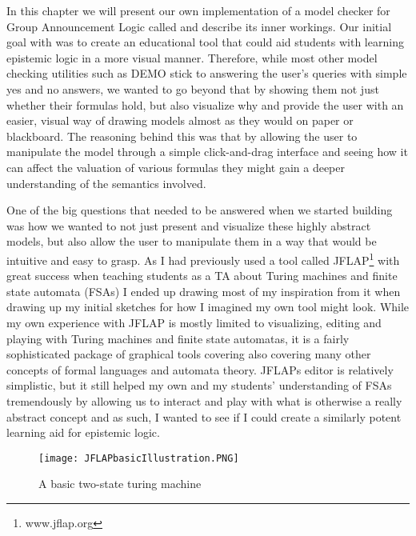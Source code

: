 In this chapter we will present our own implementation of a model checker for Group Announcement Logic called \cname{} and describe its inner workings. Our initial goal with \cname{} was to create an educational tool that could aid students with learning epistemic logic in a more visual manner. Therefore, while most other model checking utilities such as DEMO \cite{JanvanEijck} stick to answering the user's queries with simple yes and no answers, we wanted to go beyond that by showing them not just whether their formulas hold, but also visualize why and provide the user with an easier, visual way of drawing models almost as they would on paper or blackboard. The reasoning behind this was that by allowing the user to manipulate the model through a simple click-and-drag interface and seeing how it can affect the valuation of various formulas they might gain a deeper understanding of the semantics involved.

One of the big questions that needed to be answered when we started building \cname{} was how we wanted to not just present and visualize these highly abstract models, but also allow the user to manipulate them in a way that would be intuitive and easy to grasp. As I had previously used a tool called JFLAP\footnote{www.jflap.org} with great success when teaching students as a TA about Turing machines and finite state automata (FSAs) I ended up drawing most of my inspiration from it when drawing up my initial sketches for how I imagined my own tool might look. While my own experience with JFLAP is mostly limited to visualizing, editing and playing with Turing machines and finite state automatas, it is a fairly sophisticated package of graphical tools covering also covering many other concepts of formal languages and automata theory. JFLAPs editor is relatively simplistic, but it still helped my own and my students' understanding of FSAs tremendously by allowing us to interact and play with what is otherwise a really abstract concept and as such, I wanted to see if I could create a similarly potent learning aid for epistemic logic. 

\begin{figure}[H]
	\texttt{[image: JFLAPbasicIllustration.PNG]}
	\caption{A basic two-state turing machine}
	\label{fig:JFLAP_basic illustration}
\end{figure}


